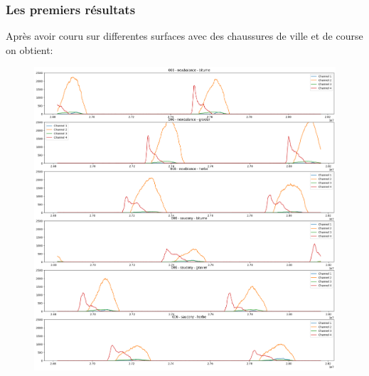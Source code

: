 \begin{frame}
    \frametitle{Les premiers résultats}
    Après avoir couru sur differentes surfaces avec des chaussures de ville et de course on obtient:
    \begin{figure}
        \includegraphics[scale=0.17]{./figures/res_01.png}
        \centering
    \end{figure}
\end{frame}
